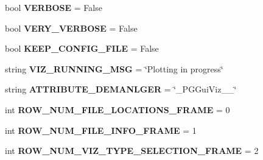 \begin{DoxyCompactItemize}
\item 
bool {\bfseries V\+E\+R\+B\+O\+SE} = False\hypertarget{namespacenegui_1_1pgguiviz_a6ff5f8b417b80327b56f0912979b283e}{}\label{namespacenegui_1_1pgguiviz_a6ff5f8b417b80327b56f0912979b283e}

\item 
bool {\bfseries V\+E\+R\+Y\+\_\+\+V\+E\+R\+B\+O\+SE} = False\hypertarget{namespacenegui_1_1pgguiviz_a5a8dc39bdd54018946a7e62e2849e555}{}\label{namespacenegui_1_1pgguiviz_a5a8dc39bdd54018946a7e62e2849e555}

\item 
bool {\bfseries K\+E\+E\+P\+\_\+\+C\+O\+N\+F\+I\+G\+\_\+\+F\+I\+LE} = False\hypertarget{namespacenegui_1_1pgguiviz_ac359ec83755b79652048ed6b10430c6d}{}\label{namespacenegui_1_1pgguiviz_ac359ec83755b79652048ed6b10430c6d}

\item 
string {\bfseries V\+I\+Z\+\_\+\+R\+U\+N\+N\+I\+N\+G\+\_\+\+M\+SG} = \char`\"{}Plotting in progress\char`\"{}\hypertarget{namespacenegui_1_1pgguiviz_acc5ab81322def82e387fbdd4d461520c}{}\label{namespacenegui_1_1pgguiviz_acc5ab81322def82e387fbdd4d461520c}

\item 
string {\bfseries A\+T\+T\+R\+I\+B\+U\+T\+E\+\_\+\+D\+E\+M\+A\+N\+L\+G\+ER} = \char`\"{}\+\_\+\+P\+G\+Gui\+Viz\+\_\+\+\_\+\char`\"{}\hypertarget{namespacenegui_1_1pgguiviz_ad6664b33538fccb188e5fa9b78791894}{}\label{namespacenegui_1_1pgguiviz_ad6664b33538fccb188e5fa9b78791894}

\item 
int {\bfseries R\+O\+W\+\_\+\+N\+U\+M\+\_\+\+F\+I\+L\+E\+\_\+\+L\+O\+C\+A\+T\+I\+O\+N\+S\+\_\+\+F\+R\+A\+ME} = 0\hypertarget{namespacenegui_1_1pgguiviz_a61887f923ad781c7dc6396b84bf94fca}{}\label{namespacenegui_1_1pgguiviz_a61887f923ad781c7dc6396b84bf94fca}

\item 
int {\bfseries R\+O\+W\+\_\+\+N\+U\+M\+\_\+\+F\+I\+L\+E\+\_\+\+I\+N\+F\+O\+\_\+\+F\+R\+A\+ME} = 1\hypertarget{namespacenegui_1_1pgguiviz_aa1abdcddad19f8cfa4de74fcc811dcac}{}\label{namespacenegui_1_1pgguiviz_aa1abdcddad19f8cfa4de74fcc811dcac}

\item 
int {\bfseries R\+O\+W\+\_\+\+N\+U\+M\+\_\+\+V\+I\+Z\+\_\+\+T\+Y\+P\+E\+\_\+\+S\+E\+L\+E\+C\+T\+I\+O\+N\+\_\+\+F\+R\+A\+ME} = 2\hypertarget{namespacenegui_1_1pgguiviz_afa36992f00dfa9c6440c957d726d3539}{}\label{namespacenegui_1_1pgguiviz_afa36992f00dfa9c6440c957d726d3539}


\end{DoxyCompactItemize}
